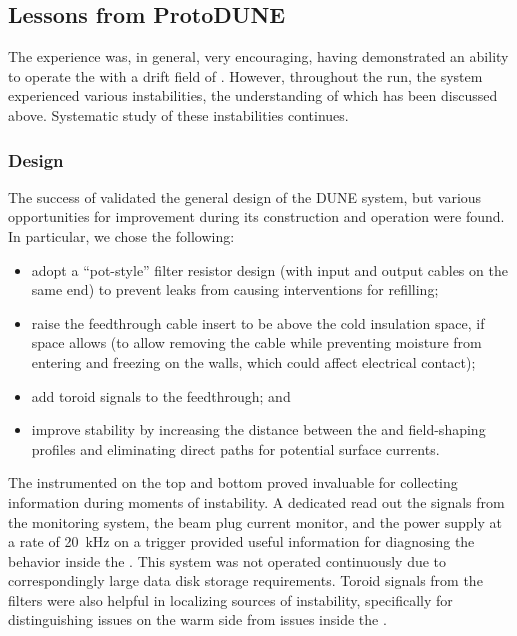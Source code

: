 \subsection{Lessons from ProtoDUNE}
\label{sec:fdsp-hv-protodune-lessons}

The   experience was, in general, very encouraging, having demonstrated 
an ability to operate the  with a drift field of \spmaxfield{}. %
However, throughout the run, the system experienced various instabilities, the understanding of which has %
been discussed above. 
Systematic study of these instabilities continues.

\subsubsection{Design}
\label{sec:fdsp-hv-protodune-lessons-design}

The success of  validated the general design of the DUNE  system, but various opportunities for improvement during its construction and operation were found. In particular, we chose the following:

\begin{itemize}
\item adopt a ``pot-style'' filter resistor design (with input and output cables on the same end) %
to prevent leaks from causing interventions for refilling;
\item raise the  feedthrough cable insert to be above the cold insulation space, if space allows (to allow removing the cable while preventing moisture from entering and freezing on the walls, which could affect electrical contact);
\item add toroid signals %
to the feedthrough; and
\item improve stability by increasing the distance between the  and field-shaping profiles and eliminating direct paths for potential surface currents.
\end{itemize}


The instrumented  on the top and bottom  proved invaluable for collecting information during moments of instability.
A dedicated  read out the signals from the  monitoring system, the beam plug current monitor, and the power supply at a rate of \SI{20}{kHz} on a trigger provided useful information for diagnosing the  behavior inside the .
This system was not operated continuously due to correspondingly large data disk storage requirements.
Toroid signals from the  filters were also helpful in localizing sources of instability, specifically for distinguishing issues on the warm side from issues inside the .


